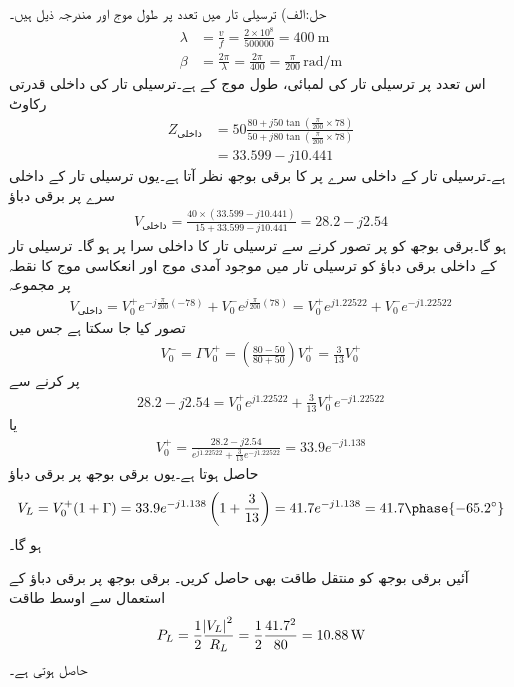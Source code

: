 حل:الف) ترسیلی تار میں  تعدد پر  طول موج اور  مندرجہ ذیل ہیں۔
\begin{align*}
\lambda&=\frac{v}{f}=\frac{2\times 10^8}{500000}=\SI{400}{\meter}\\
\beta&=\frac{2\pi}{\lambda}=\frac{2\pi}{400}=\frac{\pi}{200} \, \si{\radian\per\meter}
\end{align*}
اس تعدد پر ترسیلی تار کی لمبائی، طول موج  کے  ہے۔ترسیلی تار  کی داخلی قدرتی رکاوٹ
\begin{align*}
Z_{\text{داخلی}} &= 50 \frac{80+j 50 \tan (\frac{\pi}{200} \times 78)}{50+j 80 \tan (\frac{\pi}{200} \times 78)}\\
&=33.599-j 10.441
\end{align*}
ہے۔ترسیلی تار کے داخلی سرے پر  کا برقی بوجھ  نظر آتا ہے۔یوں ترسیلی تار کے داخلی سرے پر برقی دباؤ
\begin{align*}
V_{\text{داخلی}}=\frac{40 \times (33.599-j 10.441)}{15+33.599-j 10.441}=28.2-j 2.54
\end{align*}
ہو گا۔برقی بوجھ کو  پر تصور کرنے سے  ترسیلی تار  کا داخلی سرا  پر ہو گا۔ ترسیلی تار کے داخلی برقی دباؤ کو ترسیلی تار میں موجود آمدی موج  اور انعکاسی موج  کا نقطہ  پر مجموعہ
\begin{align*}
V_{\text{داخلی}} = V_0^+ e^{-j \frac{\pi}{200} (-78)}+V_0^- e^{j \frac{\pi}{200} (78)} = V_0^+ e^{j 1.22522}+V_0^- e^{-j 1.22522}
\end{align*}
 تصور کیا جا سکتا ہے جس میں
\begin{align*}
V_0^-=\Gamma V_0^+=\left(\frac{80-50}{80+50} \right) V_0^+=\frac{3}{13} V_0^+
\end{align*}
پر کرنے سے
\begin{align*}
28.2-j 2.54 = V_0^+ e^{j 1.22522}+\frac{3}{13} V_0^+ e^{-j 1.22522}
\end{align*}
یا
\begin{align*}
V_0^+=\frac{28.2-j 2.54}{e^{j 1.22522}+\frac{3}{13} e^{-j 1.22522}}=33.9 e^{-j 1.138}
\end{align*}
حاصل ہوتا ہے۔یوں برقی بوجھ پر برقی دباؤ
\begin{align*}
V_L=V_0^+(1+\Gamma) = 33.9 e^{-j 1.138} \left(1+\frac{3}{13}\right)=41.7 e^{-j 1.138}=41.7 \phase{-65.2^{\circ}}
\end{align*}
ہو گا۔

آئیں برقی بوجھ کو منتقل طاقت بھی حاصل کریں۔ برقی بوجھ پر برقی دباؤ  کے استعمال سے اوسط طاقت
\begin{align*}
P_L=\frac{1}{2} \frac{\abs{V_L}^2}{R_L}=\frac{1}{2} \frac{41.7^2}{80}=\SI{10.88}{\watt}
\end{align*}
حاصل ہوتی ہے۔

